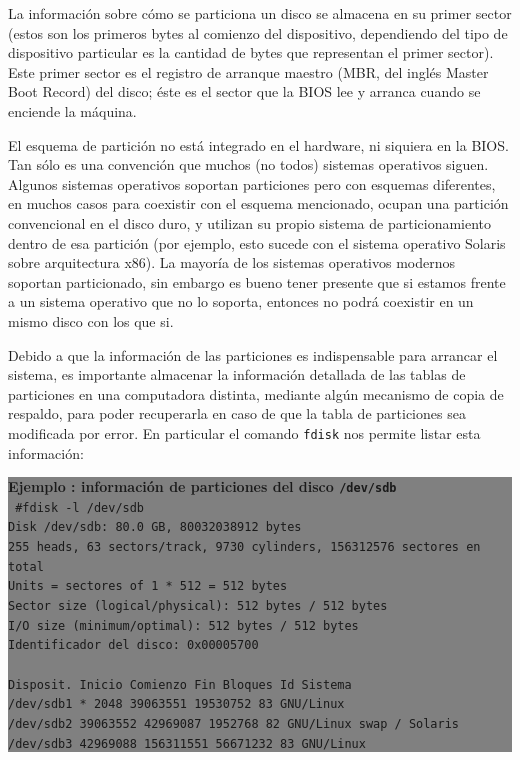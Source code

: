\documentclass[12pt]{article}
\begin{document}
La información sobre cómo se particiona un disco se almacena en su primer 
sector (estos son los primeros bytes al comienzo del dispositivo, 
dependiendo del tipo de dispositivo particular es la cantidad de bytes 
que representan el primer sector). Este primer sector es el registro de 
arranque maestro (MBR, del inglés Master Boot Record) del disco; éste es 
el sector que la BIOS lee y arranca cuando se enciende la máquina. 

El esquema de partición no está integrado en el hardware, ni siquiera 
en la BIOS. Tan sólo es una convención que muchos (no todos) sistemas 
operativos siguen. Algunos sistemas operativos soportan particiones pero 
con esquemas diferentes, en muchos casos para coexistir con el esquema 
mencionado, ocupan una partición convencional en el disco duro, y 
utilizan su propio sistema de particionamiento dentro de esa partición 
(por ejemplo, esto sucede con el sistema operativo Solaris sobre 
arquitectura x86). La mayoría de los sistemas operativos modernos
soportan particionado, sin embargo es bueno tener presente que si estamos 
frente a un sistema operativo  que no lo soporta, entonces  no podrá 
coexistir en un mismo disco con los que si. 

Debido a que la información de las particiones es indispensable para 
arrancar el sistema, es importante almacenar la información detallada 
de las tablas de 
particiones en una computadora distinta, mediante algún mecanismo de 
copia de respaldo, para poder recuperarla en 
caso de que la tabla de particiones sea modificada por error. En 
particular el comando \texttt{fdisk} nos permite listar esta información: 

\colorbox{grey}{\parbox[t]{0.95\linewidth}{ \vspace*{0.5cm} { 
{\bf Ejemplo : información de particiones del disco \texttt{/dev/sdb}}\\
{\tt
\#fdisk -l /dev/sdb\\
Disk /dev/sdb: 80.0 GB, 80032038912 bytes\\
255 heads, 63 sectors/track, 9730 cylinders, 156312576 sectores en total\\
Units = sectores of 1 * 512 = 512 bytes\\
Sector size (logical/physical): 512 bytes / 512 bytes\\
I/O size (minimum/optimal): 512 bytes / 512 bytes\\
Identificador del disco: 0x00005700\\
\\
Disposit. Inicio    Comienzo      Fin      Bloques  Id  Sistema\\
/dev/sdb1   *        2048    39063551    19530752   83  GNU/Linux\\
/dev/sdb2        39063552    42969087     1952768   82  GNU/Linux swap / Solaris\\
/dev/sdb3        42969088   156311551    56671232   83  GNU/Linux\\
}
} \vspace*{0.5cm} } } 
\end{document}
